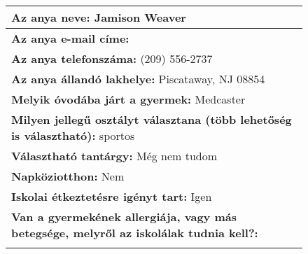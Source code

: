 \documentclass[10pt,a4paper]{article}
\begin{document}
\begin{figure}[!ht]
\begin{tabular}{|m{\textwidth}|}
\hline\vspace{3pt}
\textbf{Az anya neve:} \hspace{0.5cm} Jamison Weaver \vspace{3pt} \\
\hline\vspace{3pt}
\textbf{Az anya e-mail címe:} \hspace{0.5cm}   \vspace{3pt} \\
\hline\vspace{3pt}
\textbf{Az anya telefonszáma:} \hspace{0.5cm} (209) 556-2737 \vspace{3pt} \\
\hline\vspace{3pt}
\textbf{Az anya állandó lakhelye:} \hspace{0.5cm} Piscataway, NJ 08854 \vspace{3pt} \\
\hline\vspace{3pt}
\textbf{Melyik óvodába járt a gyermek:} \hspace{0.5cm} Medcaster \vspace{3pt} \\
\hline\vspace{3pt}
\textbf{Milyen jellegű osztályt választana (több lehetőség is választható):} \hspace{0.5cm} sportos \vspace{3pt} \\
\hline\vspace{3pt}
\textbf{Választható tantárgy:} \hspace{0.5cm} Még nem tudom \vspace{3pt} \\
\hline\vspace{3pt}
\textbf{Napköziotthon:} \hspace{0.5cm} Nem \vspace{3pt} \\
\hline\vspace{3pt}
\textbf{Iskolai étkeztetésre igényt tart:} \hspace{0.5cm} Igen \vspace{3pt} \\
\hline\vspace{3pt}
\textbf{Van a gyermekének allergiája, vagy más betegsége, melyről az iskolálak tudnia kell?:} \\ \hspace{0.5cm}  \vspace{3pt} \\

\end{tabular}
\end{figure}
\end{document}
